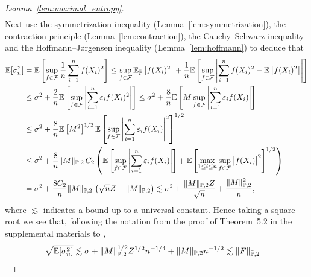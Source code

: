 \begin{proof}[Lemma~\ref{lem:maximal_entropy}]
\begin{align*}
  \end{align*}
  Next use the symmetrization inequality
  (Lemma~\ref{lem:symmetrization}),
  the contraction principle
  (Lemma~\ref{lem:contraction}),
  the Cauchy--Schwarz inequality
  and the Hoffmann--J{\o}rgensen inequality
  (Lemma~\ref{lem:hoffmann})
  to deduce that
  \begin{align*}
    \mathbb{E}[\sigma_n^2]
    &=
    \mathbb{E}\left[
      \sup_{f \in \mathcal{F}}
      \frac{1}{n}
      \sum_{i=1}^n
      f(X_i)^2
    \right]
    \leq
    \sup_{f \in \mathcal{F}}
    \mathbb{E}_{\bar{\mathbb{P}}} \left[
      f(X_i)^2
    \right]
    + \frac{1}{n}
    \mathbb{E}\left[
      \sup_{f \in \mathcal{F}}
      \left|
      \sum_{i=1}^n
      f(X_i)^2
      - \mathbb{E} \left[
        f(X_i)^2
      \right]
      \right|
    \right] \\
    &\leq
    \sigma^2
    + \frac{2}{n}
    \mathbb{E}\left[
      \sup_{f \in \mathcal{F}}
      \left|
      \sum_{i=1}^n
      \varepsilon_i
      f(X_i)^2
      \right|
    \right]
    \leq
    \sigma^2
    + \frac{8}{n}
    \mathbb{E}\left[
      M
      \sup_{f \in \mathcal{F}}
      \left|
      \sum_{i=1}^n
      \varepsilon_i
      f(X_i)
      \right|
    \right] \\
    &\leq
    \sigma^2
    + \frac{8}{n}
    \mathbb{E}\left[
      M^2
    \right]^{1/2}
    \mathbb{E}\left[
      \sup_{f \in \mathcal{F}}
      \left|
      \sum_{i=1}^n
      \varepsilon_i
      f(X_i)
      \right|^2
    \right]^{1/2} \\
    &\leq
    \sigma^2
    + \frac{8}{n}
    \|M\|_{\mathbb{P},2} \,
    C_2
    \left(
      \mathbb{E} \left[
        \sup_{f \in \mathcal{F}}
        \left|
        \sum_{i=1}^n
        \varepsilon_i
        f(X_i)
        \right|
      \right]
      +
      \mathbb{E} \left[
        \max_{1 \leq i \leq n}
        \sup_{f \in \mathcal{F}}
        \big| f(X_i) \big|^2
      \right]^{1/2}
    \right) \\
    &=
    \sigma^2
    + \frac{8C_2}{n}
    \|M\|_{\mathbb{P},2} \,
    \left(
      \sqrt{n} Z
      +
      \|M\|_{\mathbb{P},2}
    \right)
    \lesssim
    \sigma^2
    +
    \frac{\|M\|_{\mathbb{P},2} Z}{\sqrt n}
    +
    \frac{\|M\|_{\mathbb{P},2}^2}{n},
  \end{align*}
  where $\lesssim$ indicates a bound up to a universal constant.
  Hence taking a square root we see that,
  following the notation from the proof of Theorem~5.2
  in the supplemental materials to
  \citet{chernozhukov2014gaussian},
  \begin{align*}
    \sqrt{\E[\sigma_n^2]}
    &\lesssim
    \sigma
    +
    \|M\|_{\P,2}^{1/2} Z^{1/2} n^{-1/4}
    +
    \|M\|_{\P,2} n^{-1/2}
    \lesssim
    \|F\|_{\bar\P,2}

\end{align*}
\end{proof}
